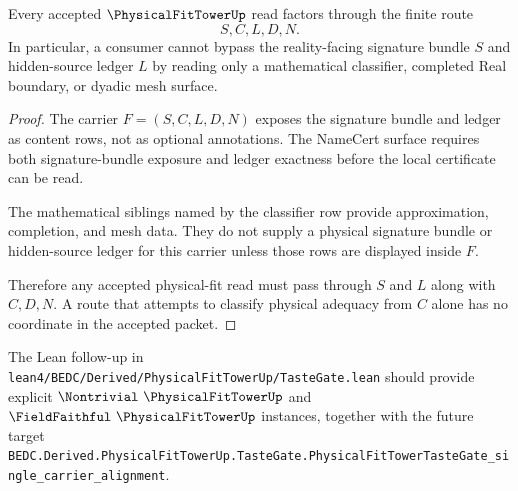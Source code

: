 \begin{theorem}
\label{thm:physical-fit-tower-signature-nonescape}
Every accepted $\PhysicalFitTowerUp$ read factors through the finite route
$$
S,C,L,D,N.
$$
In particular, a consumer cannot bypass the reality-facing signature bundle $S$ and hidden-source ledger $L$ by reading only a mathematical classifier, completed Real boundary, or dyadic mesh surface.
\end{theorem}
\begin{proof}
The carrier $F=(S,C,L,D,N)$ exposes the signature bundle and ledger as content rows, not as optional annotations. The NameCert surface requires both signature-bundle exposure and ledger exactness before the local certificate can be read.

The mathematical siblings named by the classifier row provide approximation, completion, and mesh data. They do not supply a physical signature bundle or hidden-source ledger for this carrier unless those rows are displayed inside $F$.

Therefore any accepted physical-fit read must pass through $S$ and $L$ along with $C,D,N$. A route that attempts to classify physical adequacy from $C$ alone has no coordinate in the accepted packet.
\end{proof}



The Lean follow-up in \texttt{lean4/BEDC/Derived/PhysicalFitTowerUp/TasteGate.lean} should provide explicit $\Nontrivial\ \PhysicalFitTowerUp$ and $\FieldFaithful\ \PhysicalFitTowerUp$ instances, together with the future target \texttt{BEDC.Derived.PhysicalFitTowerUp.TasteGate.PhysicalFitTowerTasteGate\_single\_carrier\_alignment}.


